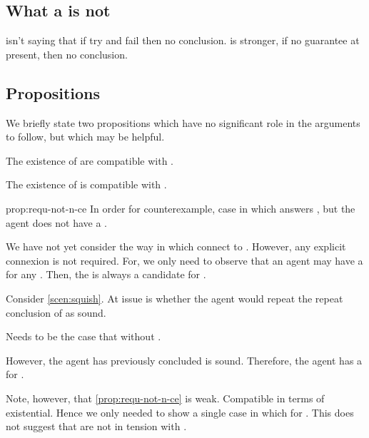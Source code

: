 \subsection{What a \requ{} is not}

\begin{note}
  \requ{} isn't saying that if try and fail then no conclusion.
  \requ{} is stronger, if no guarantee at present, then no conclusion.
\end{note}

\subsection{Propositions}
\label{sec:propsoitions}

\begin{note}
  We briefly state two propositions which have no significant role in the arguments to follow, but which may be helpful.
\end{note}

\begin{note}
  The existence of  are compatible with \issueConstraint{}.
  \begin{proposition}
    \label{prop:requ-not-n-ce}
    The existence of  is compatible with \issueConstraint{}.
  \end{proposition}
  \begin{argument}{prop:requ-not-n-ce}
    In order for counterexample, case in which \ros{} answers \qWhyV{}, but the agent does not have a \wit{}.

    We have not yet consider the way in which  connect to \qWhyV{}.
    However, any explicit connexion is not required.
    For, we only need to observe that an agent may have a \wit{} for any \requ{}.
    Then, the \wit{} is always a candidate for \qHowV{}.

    Consider \autoref{scen:squish}.
    At issue is whether the agent would repeat the repeat conclusion of \sqE{} as sound.

    Needs to be the case that \ros{} without \wit{}.

    However, the agent has previously concluded \sqE{} is sound.
    Therefore, the agent has a \wit{} for \ros{}.
  \end{argument}

  Note, however, that \autoref{prop:requ-not-n-ce} is weak.
  Compatible in terms of existential.
  Hence we only needed to show a single case in which \wit{} for \requ{}.
  This does not suggest that  are not in tension with \issueConstraint{}.
\end{note}

